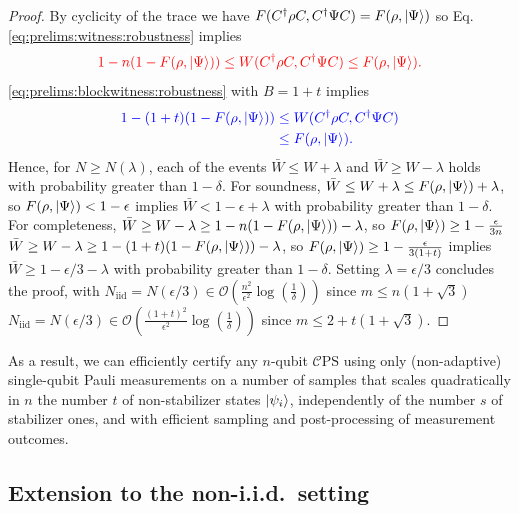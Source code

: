 \documentclass[a4paper,twocolumn,11pt,unpublished]{../../revision/quantumarticle}
\newcommand{\Niid}{N_{\mathrm{iid}}}
\newcommand{\mCEPS}{\mathcal{C}\text{PS}}
\providecommand{\DIFadd}[1]{{\protect\color{blue} \sf #1}} %
\providecommand{\DIFdel}[1]{{\protect\color{red} \scriptsize #1}} %
\providecommand{\DIFaddbegin}{} %
\providecommand{\DIFaddend}{} %
\providecommand{\DIFdelbegin}{} %
\providecommand{\DIFdelend}{} %
\begin{document}
\begin{proof}
        By cyclicity of the trace we have $F(C^\dagger\rho C,C^\dagger\Psi C)=F(\rho,\ket\Psi)$ so Eq.~\DIFdelbegin \DIFdel{\eqref{eq:prelims:witness:robustness} implies
        }\begin{displaymath}
            \DIFdel{1-n(1-F(\rho,\ket\Psi)) \leq W(C^\dagger\rho C,C^\dagger\Psi C) \leq F(\rho,\ket\Psi).
        }\end{displaymath}%
\DIFdelend \DIFaddbegin \DIFadd{\eqref{eq:prelims:blockwitness:robustness} with $B=1+t$ implies
        }\begin{equation}
            \DIFadd{\begin{aligned}
            1-(1+t)(1-F(\rho,\ket\Psi)) &\leq W(C^\dagger\rho C,C^\dagger\Psi C)\\
            &\leq F(\rho,\ket\Psi).
            \end{aligned}
        }\end{equation}\DIFaddend 
        Hence, for $N\ge N(\lambda)$, each of the events $\bar W \leq W + \lambda$ and $\bar W \geq W - \lambda$ holds with probability greater than $1-\delta$. For soundness, $\bar W \leq W+\lambda \leq F(\rho,\ket\Psi)+\lambda$, so $F(\rho,\ket\Psi)<1-\epsilon$ implies $\bar W<1-\epsilon+\lambda$ with probability greater than $1-\delta$. For completeness, \DIFdelbegin \DIFdel{$\bar W \geq W-\lambda \geq 1-n(1-F(\rho,\ket\Psi))-\lambda$, so $F(\rho,\ket\Psi)\ge1-\frac{\epsilon}{3n}$ }\DIFdelend \DIFaddbegin \DIFadd{$\bar W \geq W-\lambda \geq 1-(1+t)(1-F(\rho,\ket\Psi))-\lambda$, so $F(\rho,\ket\Psi)\ge1-\frac{\epsilon}{3(1+t)}$ }\DIFaddend implies $\bar W\ge1-\epsilon/3-\lambda$ with probability greater than $1-\delta$. Setting $\lambda=\epsilon/3$ concludes the proof, with \DIFdelbegin \DIFdel{$\Niid=N(\epsilon/3)\in\mathcal O(\frac{n^2}{\epsilon^2}\log(\frac{1}{\delta}))$ since $m\le n(1+\sqrt3)$}\DIFdelend \DIFaddbegin \DIFadd{$\Niid=N(\epsilon/3)\in\mathcal O(\frac{(1+t)^2}{\epsilon^2}\log(\frac{1}{\delta}))$ since $m\le 2+t(1+\sqrt3)$}\DIFaddend .
        \end{proof}
        As a result, we can efficiently certify any $n$-qubit $\mCEPS$ using only (non-adaptive) single-qubit Pauli measurements on a number of samples that scales quadratically in \DIFdelbegin \DIFdel{$n$ }\DIFdelend \DIFaddbegin \DIFadd{the number $t$ of non-stabilizer states $\ket{\psi_i}$, independently of the number $s$ of stabilizer ones, }\DIFaddend and with efficient sampling and post-processing of measurement outcomes.


\subsection{Extension to the non-i.i.d.\ setting}
\end{document}
